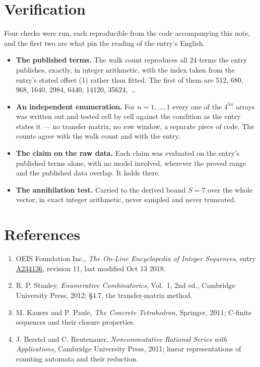 \documentclass[11pt]{article}
\theoremstyle{definition}
\begin{document}
\section{Verification}

Four checks were run, each reproducible from the code accompanying this note, and the first two are what pin the reading of the entry's English.

\begin{itemize}

\item {\bfseries The published terms.} The walk count reproduces all 24 terms the entry publishes, exactly, in integer arithmetic, with the index taken from the entry's stated offset (1) rather than fitted. The first of them are 512, 680, 968, 1640, 2984, 6440, 14120, 35624,~\dots

\item {\bfseries An independent enumeration.} For $n = 1,\dots,1$ every one of the $4^{5n}$ arrays was written out and tested cell by cell against the condition as the entry states it --- no transfer matrix, no row window, a separate piece of code. The counts agree with the walk count and with the entry.

\item {\bfseries The claim on the raw data.} Each claim was evaluated on the entry's published terms alone, with no model involved, wherever the proved range and the published data overlap. It holds there.

\item {\bfseries The annihilation test.} Carried to the derived bound $S = 7$ over the whole vector, in exact integer arithmetic, never sampled and never truncated.

\end{itemize}

\section{References}

\begin{enumerate}

\item OEIS Foundation Inc., \emph{The On-Line Encyclopedia of Integer Sequences}, entry \href{https://oeis.org/A234136}{A234136}, revision 11, last modified Oct 13 2018.

\item R. P. Stanley, \emph{Enumerative Combinatorics}, Vol.~1, 2nd ed., Cambridge University Press, 2012; \S4.7, the transfer-matrix method.

\item M. Kauers and P. Paule, \emph{The Concrete Tetrahedron}, Springer, 2011; C-finite sequences and their closure properties.

\item J. Berstel and C. Reutenauer, \emph{Noncommutative Rational Series with Applications}, Cambridge University Press, 2011; linear representations of counting automata and their reduction.

\end{enumerate}
\end{document}

